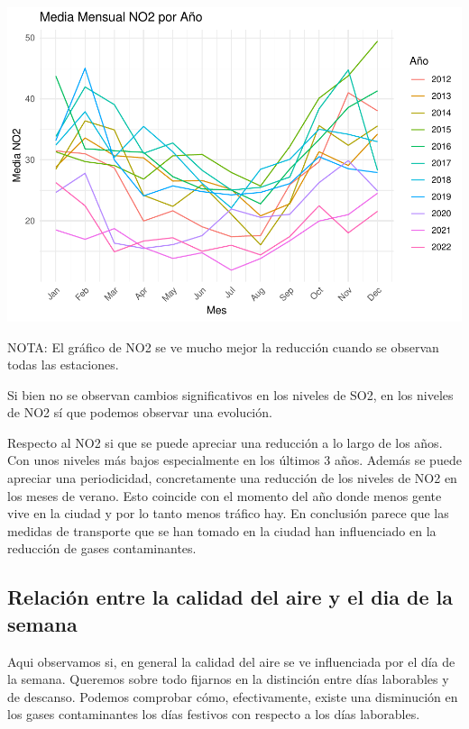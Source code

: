 \documentclass[notspecified,article,submit,moreauthors,pdftex]{Definitions/mdpi}
\begin{document}
\includegraphics{ProyectoAED2023_plantilla_files/figure-latex/unnamed-chunk-27-2.pdf}

NOTA: El gráfico de NO2 se ve mucho mejor la reducción cuando se
observan todas las estaciones.

Si bien no se observan cambios significativos en los niveles de SO2, en
los niveles de NO2 sí que podemos observar una evolución.

Respecto al NO2 si que se puede apreciar una reducción a lo largo de los
años. Con unos niveles más bajos especialmente en los últimos 3 años.
Además se puede apreciar una periodicidad, concretamente una reducción
de los niveles de NO2 en los meses de verano. Esto coincide con el
momento del año donde menos gente vive en la ciudad y por lo tanto menos
tráfico hay. En conclusión parece que las medidas de transporte que se
han tomado en la ciudad han influenciado en la reducción de gases
contaminantes.

\hypertarget{relaciuxf3n-entre-la-calidad-del-aire-y-el-dia-de-la-semana}{%
\subsection{Relación entre la calidad del aire y el dia de la
semana}\label{relaciuxf3n-entre-la-calidad-del-aire-y-el-dia-de-la-semana}}

Aqui observamos si, en general la calidad del aire se ve influenciada
por el día de la semana. Queremos sobre todo fijarnos en la distinción
entre días laborables y de descanso. Podemos comprobar cómo,
efectivamente, existe una disminución en los gases contaminantes los
días festivos con respecto a los días laborables.
\end{document}
